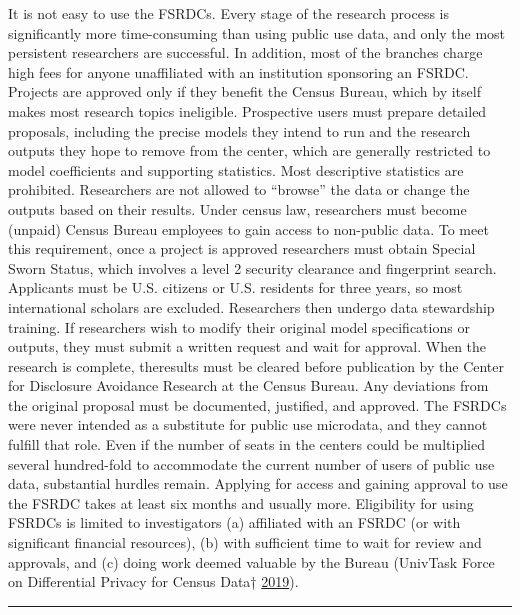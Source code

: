 \documentclass[]{krantz}
\begin{document}
It is not easy to use the FSRDCs. Every stage of the research process is
significantly more time-consuming than using public use data, and only
the most persistent researchers are successful. In addition, most of the
branches charge high fees for anyone unaffiliated with an institution
sponsoring an FSRDC. Projects are approved only if they benefit the
Census Bureau, which by itself makes most research topics ineligible.
Prospective users must prepare detailed proposals, including the precise
models they intend to run and the research outputs they hope to remove
from the center, which are generally restricted to model coefficients
and supporting statistics. Most descriptive statistics are prohibited.
Researchers are not allowed to ``browse'' the data or change the outputs
based on their results. Under census law, researchers must become
(unpaid) Census Bureau employees to gain access to non-public data. To
meet this requirement, once a project is approved researchers must
obtain Special Sworn Status, which involves a level 2 security clearance
and fingerprint search. Applicants must be U.S. citizens or U.S.
residents for three years, so most international scholars are excluded.
Researchers then undergo data stewardship training. If researchers wish
to modify their original model specifications or outputs, they must
submit a written request and wait for approval. When the research is
complete, theresults must be cleared before publication by the Center
for Disclosure Avoidance Research at the Census Bureau. Any deviations
from the original proposal must be documented, justified, and approved.
The FSRDCs were never intended as a substitute for public use microdata,
and they cannot fulfill that role. Even if the number of seats in the
centers could be multiplied several hundred-fold to accommodate the
current number of users of public use data, substantial hurdles remain.
Applying for access and gaining approval to use the FSRDC takes at least
six months and usually more. Eligibility for using FSRDCs is limited to
investigators (a) affiliated with an FSRDC (or with significant
financial resources), (b) with sufficient time to wait for review and
approvals, and (c) doing work deemed valuable by the Bureau (UnivTask
Force on Differential Privacy for Census Data†
\protect\hyperlink{ref-UnivTaskForceonDifferentialPrivacyforCensusData2019}{2019}).

\begin{center}\rule{0.5\linewidth}{\linethickness}\end{center}
\end{document}
